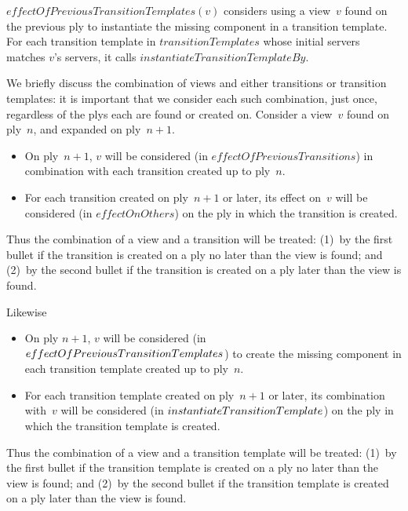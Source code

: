 $effectOfPreviousTransitionTemplates(v)$ considers using a view~$v$ found on
the previous ply to instantiate the missing component in a transition
template.  For each transition template in $transitionTemplates$ whose initial
servers matches $v$'s servers, it calls $instantiateTransitionTemplateBy$.

We briefly discuss the combination of views and either transitions or
transition templates: it is important that we consider each such combination,
just once, regardless of the plys each are found or created on.  Consider a
view~$v$ found on ply~$n$, and expanded on ply~$n+1$.
%
\begin{itemize}
\item On ply~$n+1$, $v$ will be considered (in $effectOfPreviousTransitions$)
  in combination with each transition created up to ply~$n$.

\item For each transition created on ply~$n+1$ or later, its effect on~$v$
  will be considered (in $effectOnOthers$) on the ply in which the transition
  is created. 
\end{itemize}
%
Thus the combination of a view and a transition will be treated: (1)~by the
first bullet if the transition is created on a ply no later than the view is
found; and (2)~by the second bullet if the transition is created on a ply
later than the view is found.  

Likewise
%
\begin{itemize}
\item On ply $n+1$, $v$ will be considered (in
  $effect\-Of\-Previous\-Transition\-Templates$) to create the missing
  component in each transition template created up to ply~$n$.

\item For each transition template created on ply~$n+1$ or later, its
  combination with~$v$ will be considered (in
  $instantiate\-Transition\-Template$) on the ply in which the transition
  template is created.
\end{itemize}
%
Thus the combination of a view and a transition template will be treated:
(1)~by the first bullet if the transition template is created on a ply no
later than the view is found; and (2)~by the second bullet if the transition
template is created on a ply later than the view is found.

